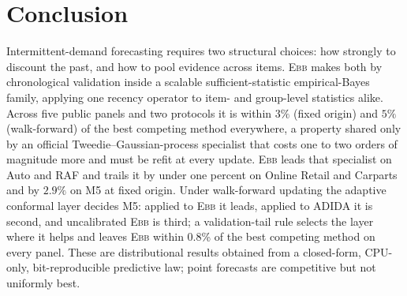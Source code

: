 \documentclass[twocolumn,10pt]{article}
\theoremstyle{definition}
\newcommand{\EBB}{\textsc{Ebb}}
\begin{document}
\section{Conclusion}\label{sec:conclusion}

Intermittent-demand forecasting requires two structural choices: how
strongly to discount the past, and how to pool evidence across items.
\EBB{} makes both by chronological validation inside a scalable
sufficient-statistic empirical-Bayes family, applying one recency operator
to item- and group-level statistics alike. %
Across five public panels and two
protocols it is within $3\%$ (fixed origin) and $5\%$ (walk-forward) of
the best competing method everywhere, a property shared only by an
official Tweedie--Gaussian-process specialist that costs one to two orders
of magnitude more and must be refit at every update. \EBB{} leads that
specialist on Auto and RAF and trails it by under one percent on Online
Retail and Carparts and by $2.9\%$ on M5 at fixed origin. Under
walk-forward updating the adaptive conformal layer decides M5: applied to
\EBB{} it leads, applied to ADIDA it is second, and uncalibrated \EBB{} is
third; a validation-tail rule selects the layer where it helps and leaves
\EBB{} within 0.8\% of the best competing method on every panel. These are distributional results obtained from a
closed-form, CPU-only, bit-reproducible predictive law; point forecasts
are competitive but not uniformly best.
\end{document}
